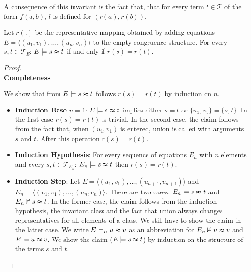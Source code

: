 A consequence of this invariant is the fact that, that for every term $t \in \mathcal{T}$ of the form $f(a,b)$, $l$ is defined for $(r(a),r(b))$.

\begin{proposition}

Let $r(.)$ be the representative mapping obtained by adding equations $E = \langle (u_1,v_1), \ldots, (u_n,v_n) \rangle $ to the empty congruence structure.
For every $s,t \in \mathcal{T}_E$: $E \models s \thickapprox t$ if and only if $r(s) = r(t)$.

\end{proposition}

\begin{proof}
\\
\textbf{Completeness}

\noindent We show that from $E \models s \thickapprox t$ follows $r(s) = r(t)$ by induction on $n$.

\begin{itemize}
\item \textbf{Induction Base} $n=1$: $E \models s \thickapprox t$ implies either $s = t$ or $\{u_1,v_1\} = \{s,t\}$.
In the first case $r(s) = r(t)$ is trivial. 
In the second case, the claim follows from the fact that, when $(u_1,v_1)$ is entered, union is called with arguments $s$ and $t$.
After this operation $r(s) = r(t)$.

\item \textbf{Induction Hypothesis}: For every sequence of equations $E_n$ with $n$ elements and every $s,t \in \mathcal{T}_{E_n}$: $E_n \models s \thickapprox t$ then $r(s) = r(t)$.

\item \textbf{Induction Step}: Let $E = \langle (u_1,v_1), \ldots, (u_{n+1},v_{n+1}) \rangle$ and $E_n = \langle (u_1,v_1), \ldots, (u_n,v_n) \rangle$.
There are two cases: $E_n \models s\thickapprox t$ and $E_n \nvDash s\thickapprox t$.
In the former case, the claim follows from the induction hypothesis, the invariant class and the fact that union always changes representatives for all elements of a class.
We still have to show the claim in the latter case.
We write $E \models_n u \thickapprox v$ as an abbreviation for $E_n \nvDash u \thickapprox v$ and $E \models u \thickapprox v$.
We show the claim ($E \models s \thickapprox t$) by induction on the structure of the terms $s$ and $t$.


\end{itemize}
\end{proof}
